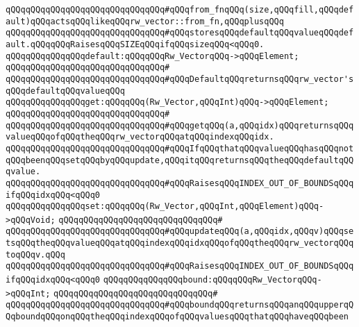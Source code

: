 \verb|qQQqqQQqqQQqqQQqqQQqqQQqqQQqqQQq#qQQqfrom_fnqQQq(size,qQQqfill,qQQqdefault)qQQqactsqQQqlikeqQQqrw_vector::from_fn,qQQqplusqQQq|\newline
\verb|qQQqqQQqqQQqqQQqqQQqqQQqqQQqqQQq#qQQqstoresqQQqdefaultqQQqvalueqQQqdefault.qQQqqQQqRaisesqQQqSIZEqQQqifqQQqsizeqQQq<qQQq0.|\newline
\newline
\newline
\verb|qQQqqQQqqQQqqQQqdefault:qQQqqQQqRw_VectorqQQq->qQQqElement;|\newline
\verb|qQQqqQQqqQQqqQQqqQQqqQQqqQQqqQQq#|\newline
\verb|qQQqqQQqqQQqqQQqqQQqqQQqqQQqqQQq#qQQqDefaultqQQqreturnsqQQqrw_vector'sqQQqdefaultqQQqvalueqQQq|\newline
\newline
\verb|qQQqqQQqqQQqqQQqget:qQQqqQQq(Rw_Vector,qQQqInt)qQQq->qQQqElement;|\newline
\verb|qQQqqQQqqQQqqQQqqQQqqQQqqQQqqQQq#|\newline
\verb|qQQqqQQqqQQqqQQqqQQqqQQqqQQqqQQq#qQQqgetqQQq(a,qQQqidx)qQQqreturnsqQQqvalueqQQqofqQQqtheqQQqrw_vectorqQQqatqQQqindexqQQqidx.|\newline
\verb|qQQqqQQqqQQqqQQqqQQqqQQqqQQqqQQq#qQQqIfqQQqthatqQQqvalueqQQqhasqQQqnotqQQqbeenqQQqsetqQQqbyqQQqupdate,qQQqitqQQqreturnsqQQqtheqQQqdefaultqQQqvalue.|\newline
\verb|qQQqqQQqqQQqqQQqqQQqqQQqqQQqqQQq#qQQqRaisesqQQqINDEX_OUT_OF_BOUNDSqQQqifqQQqidxqQQq<qQQq0|\newline
\newline
\newline
\verb|qQQqqQQqqQQqqQQqset:qQQqqQQq(Rw_Vector,qQQqInt,qQQqElement)qQQq->qQQqVoid;|\newline
\verb|qQQqqQQqqQQqqQQqqQQqqQQqqQQqqQQq#|\newline
\verb|qQQqqQQqqQQqqQQqqQQqqQQqqQQqqQQq#qQQqupdateqQQq(a,qQQqidx,qQQqv)qQQqsetsqQQqtheqQQqvalueqQQqatqQQqindexqQQqidxqQQqofqQQqtheqQQqrw_vectorqQQqtoqQQqv.qQQq|\newline
\verb|qQQqqQQqqQQqqQQqqQQqqQQqqQQqqQQq#qQQqRaisesqQQqINDEX_OUT_OF_BOUNDSqQQqifqQQqidxqQQq<qQQq0|\newline
\newline
\newline
\verb|qQQqqQQqqQQqqQQqbound:qQQqqQQqRw_VectorqQQq->qQQqInt;|\newline
\verb|qQQqqQQqqQQqqQQqqQQqqQQqqQQqqQQq#|\newline
\verb|qQQqqQQqqQQqqQQqqQQqqQQqqQQqqQQq#qQQqboundqQQqreturnsqQQqanqQQqupperqQQqboundqQQqonqQQqtheqQQqindexqQQqofqQQqvaluesqQQqthatqQQqhaveqQQqbeen|\newline
